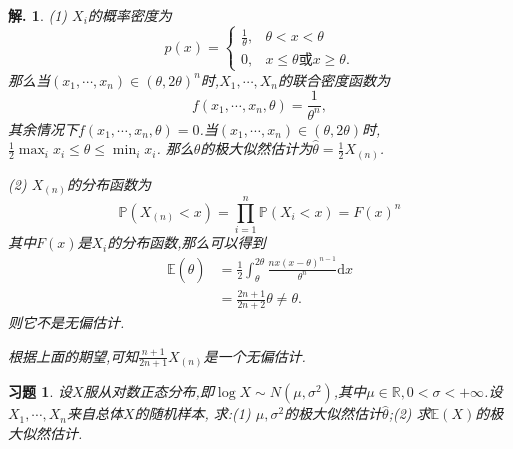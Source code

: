 \documentclass[a4paper,oneside,12pt]{ctexart}
\theoremstyle{plain}
\newtheorem{exercise}{习题}
\theoremstyle{nonumberplain}
\newtheorem{solution}{解.}
\theoremstyle{nonumberplain}
\newcommand{\dif}{\mathrm{d}}
\newcommand{\R}{\mathbb{R}}
\newcommand{\expect}{\mathbb{E}}
\newcommand{\prob}{\mathbb{P}}
\begin{document}
    \begin{solution}
        (1) $X_i$的概率密度为 
        \begin{equation*}
            p(x)=\begin{cases}
                \frac{1}{\theta}, &\theta<x<\theta\\
                0,& x\leqslant\theta\text{或}x\geqslant\theta.
            \end{cases}
        \end{equation*}
        那么当$(x_1,\cdots,x_n)\in(\theta,2\theta)^n$时,$X_1,\cdots,X_n$的联合密度函数为 
        \begin{equation*}
            f(x_1,\cdots,x_n,\theta)=\frac{1}{\theta^n},
        \end{equation*}
        其余情况下$f(x_1,\cdots,x_n,\theta)=0$.当$(x_1,\cdots,x_n)\in(\theta,2\theta)$时,$\frac{1}{2}\max_ix_i\leqslant\theta\leqslant\min_ix_i$.
        那么$\theta$的极大似然估计为$\hat{\theta}=\frac{1}{2}X_{(n)}$.

        (2) $X_{(n)}$的分布函数为 
        \begin{equation*}
                \prob(X_{(n)}<x)=\prod_{i=1}^n\prob(X_i<x)=F(x)^n
        \end{equation*}
        其中$F(x)$是$X_i$的分布函数,那么可以得到 
        \begin{align*}
            \expect(\hat{\theta})&=\frac{1}{2}\int_\theta^{2\theta}\frac{nx(x-\theta)^{n-1}}{\theta^n}\dif x\\
            &=\frac{2n+1}{2n+2}\theta\neq\theta.
        \end{align*}
        则它不是无偏估计.

        根据上面的期望,可知$\frac{n+1}{2n+1}X_{(n)}$是一个无偏估计.
    \end{solution}

    \begin{exercise}
        \label{ex:5}
        设$X$服从对数正态分布,即$\log X\sim N(\mu,\sigma^2)$,其中$\mu\in \R,0<\sigma<+\infty$.设$X_1,\cdots,X_n$来自总体$X$的随机样本,
        求:(1) $\mu,\sigma^2$的极大似然估计$\hat{\theta}$;(2) 求$\expect(X)$的极大似然估计. 
    \end{exercise}
\end{document}
